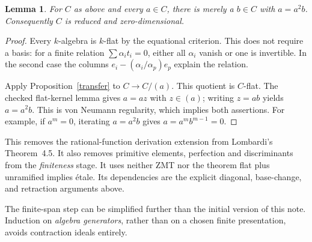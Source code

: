 \documentclass[11pt]{article}
\newtheorem{lemma}[proposition]{Lemma}
\begin{document}
\begin{lemma}\label{regular}
For $C$ as above and every $a\in C$, there is merely a $b\in C$ with
$a=a^2b$.  Consequently $C$ is reduced and zero-dimensional.
\end{lemma}
\begin{proof}
Every $k$-algebra is $k$-flat by the equational criterion.  This does
not require a basis: for a finite relation $\sum\alpha_i t_i=0$,
either all $\alpha_i$ vanish or one is invertible.  In the second case
the columns $e_i-(\alpha_i/\alpha_p)e_p$ explain the relation.

Apply Proposition~\ref{transfer} to $C\to C/(a)$.  This quotient is
$C$-flat.  The checked flat-kernel lemma gives $a=az$ with $z\in(a)$;
writing $z=ab$ yields $a=a^2b$.
This is von Neumann regularity, which implies both assertions.  For
example, if $a^m=0$, iterating $a=a^2b$ gives $a=a^m b^{m-1}=0$.
\end{proof}

This removes the rational-function derivation extension from
Lombardi's Theorem~4.5.  It also removes primitive elements, perfection
and discriminants from the \emph{finiteness} stage.  It uses neither
ZMT nor the theorem flat plus unramified implies \'etale.  Its dependencies
are the explicit diagonal, base-change, and retraction arguments above.

The finite-span step can be simplified further than the initial version
of this note.  Induction on \emph{algebra generators}, rather than on a
chosen finite presentation, avoids contraction ideals entirely.
\end{document}
